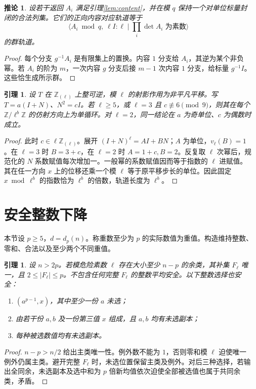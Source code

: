 \documentclass[11pt,a4paper]{article}
\newcommand{\Z}{\mathbb Z}
\newtheorem{lemma}[theorem]{引理}
\newtheorem{corollary}[theorem]{推论}
\theoremstyle{definition}
\numberwithin{equation}{section}
\begin{document}
\begin{corollary}\label{cor:finite-group}
设若干返回 $A_i$ 满足引理\ref{lem:content}，并在模 $q$ 保持一个对单位标量封闭的合法列集。它们的正向内容对应轨道等于
\[
\langle A_i\bmod q,\ \ell I:\ell\mid\prod_i\det A_i\text{ 为素数}\rangle
\]
的群轨道。
\end{corollary}
\begin{proof}
每个分支 $g^{-1}A_i$ 是有限集上的置换。内容 $1$ 分支给 $A_i$，其逆为某个非负幂。若 $A_i$ 的阶为 $m$，一次内容 $g$ 分支后接 $m-1$ 次内容 $1$ 分支，给标量 $g^{-1}I$。这些恰生成所示群。
\end{proof}

\begin{lemma}\label{lem:local-cycle}
设 $T$ 在 $\Z_{(\ell)}$ 上整可逆，模 $\ell$ 的射影作用为非平凡平移。写 $T=a(I+N)$、$N^2=cI$。若 $\ell\ge5$，或 $\ell=3$ 且 $c\not\equiv6\pmod9$，则其在每个 $\Z/\ell^b\Z$ 的仿射方向上为单循环。对 $\ell=2$，同一结论在 $a$ 为奇单位、$c$ 为偶数时成立。
\end{lemma}
\begin{proof}
此时 $c\in\ell\Z_{(\ell)}$。展开 $(I+N)^\ell=A I+B N$；$A$ 为单位，$v_\ell(B)=1$。在 $\ell=3$ 时 $B=3+c$，在 $\ell=2$ 时 $A=1+c,B=2$。反复取 $\ell$ 次幂后，规范化的 $N$ 系数赋值每次增加一。一般幂的系数赋值因而等于指数的 $\ell$ 进赋值。其在任一方向 $x$ 上的位移还乘一个模 $\ell$ 等于原平移步长的单位。因此固定 $x\bmod\ell^b$ 的指数恰为 $\ell^b$ 的倍数，轨道长度为 $\ell^b$。
\end{proof}


\section{安全整数下降}
本节设 $p\ge5$，$d=d_p(n)$。称重数至少为 $p$ 的实际数值为重值。构造维持整数、零和、合法以及至少两个不同重值。

\begin{lemma}\label{lem:safety}
设 $n>2p$。若模危险素数 $\ell$ 存在大小至少 $n-p$ 的余类，其补集 $F_\ell$ 唯一，且 $2\le|F_\ell|\le p$。不包含任何完整 $F_\ell$ 的整数平均安全。以下整数选择也安全：
\begin{enumerate}
\item $(a^{p-1},x)$，其中至少一份 $a$ 未选；
\item 由若干份 $a,b$ 及一份第三值 $x$ 组成，且 $a,b$ 均有未选副本；
\item 每种被选数值均有未选副本。
\end{enumerate}
\end{lemma}
\begin{proof}
$n-p>n/2$ 给出主类唯一性。例外数不能为 $1$，否则零和模 $\ell$ 迫使唯一例外仍属主类。避开完整 $F_\ell$ 时，未选位置保留主类及例外。对后三种选择，若输出全同余，未选副本及选中和为 $p$ 倍新均值依次迫使全部被选值也属于共同余类，矛盾。
\end{proof}
\end{document}
